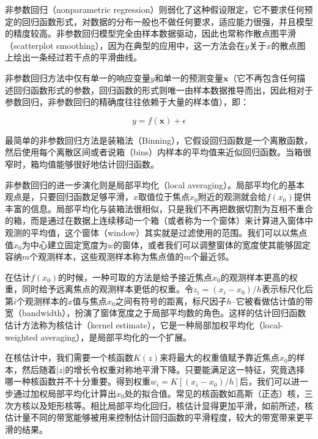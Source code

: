 非参数回归（nonparametric regression）则弱化了这种假设限定，它不要求任何预定的回归函数形式，对数据的分布一般也不做任何要求，适应能力很强，并且模型的精度较高。非参数回归模型完全由样本数据驱动，因此也常称作散点图平滑（scatterplot smoothing），因为在典型的应用中，这一方法会在$y$关于$x$的散点图上绘出一条经过若干点的平滑曲线。

非参数回归方法中仅有单一的响应变量$y$和单一的预测变量$\mathbf{x}$（它不再包含任何描述回归函数形式的参数，回归函数的形式则唯一由样本数据推导而出，因此相对于参数回归，非参数回归的精确度往往依赖于大量的样本值），即：

\begin{equation}
	y=f(\mathbf{x})+\epsilon
\end{equation}

最简单的非参数回归方法是装箱法\cite{b:nonparametricregression}（Binning），它假设回归函数是一个离散函数，然后使用每个离散区间或者说箱（bins）内样本的平均值来近似回归函数。当箱很窄时，箱均值能够很好地估计回归函数。

非参数回归的进一步演化则是局部平均化（local averaging）。局部平均化的基本观点是，只要回归函数足够平滑，$x$取值位于焦点$x_0$附近的观测就会给$f(x_0)$提供丰富的信息。局部平均化与装箱法很相似，只是我们不再把数据切割为互相不重合的箱，而是通过在数据上连续移动一个箱（或者称为一个窗体）来计算进入窗体中观测的平均值，这个窗体（window）其实就是过滤使用的范围。我们可以以焦点值$x_0$为中心建立固定宽度为$w$的窗体，或者我们可以调整窗体的宽度使其能够固定容纳$m$个观测样本，这些观测样本称为焦点值的$m$个最近邻。

在估计$f(x_0)$的时候，一种可取的方法是给予接近焦点$x_0$的观测样本更高的权重，同时给予远离焦点的观测样本更低的权重。令$z_i=(x_i-x_0)/h$表示标尺化后第$i$个观测样本的$x$值与焦点$x_0$之间有符号的距离，标尺因子$h$--它被看做估计值的带宽（bandwidth），扮演了窗体宽度之于局部平均数的角色。这样的估计回归函数估计方法称为核估计（kernel estimate），它是一种局部加权平均化（local-weighted averaging），是局部平均化的一个扩展。

在核估计中，我们需要一个核函数$K(z)$来将最大的权重值赋予靠近焦点$x_0$的样本，然后随着$|z|$的增长令权重对称地平滑下降。只要能满足这一特征，究竟选择哪一种核函数并不十分重要。得到权重$w_i=K[(x_i-x_0)/h]$后，我们可以进一步通过加权局部平均化计算出$x_0$处的拟合值。常见的核函数如高斯（正态）核，三次方核以及矩形核等。相比局部平均化回归，核估计显得更加平滑，如前所述，核估计量不同的带宽能够被用来控制估计回归函数的平滑程度，较大的带宽带来更平滑的结果。

